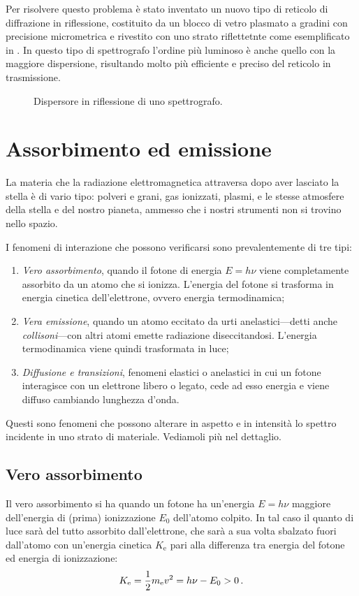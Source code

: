     Per risolvere questo problema è stato inventato un nuovo tipo di reticolo di diffrazione in riflessione, costituito da un blocco di vetro plasmato a gradini con precisione micrometrica e rivestito con uno strato riflettetnte come esemplificato in . In questo tipo di spettrografo l'ordine più luminoso è anche quello con la maggiore dispersione, risultando molto più efficiente e preciso del reticolo in trasmissione.
    \begin{figure}
        \centering
        \caption{Dispersore in riflessione di uno spettrografo.}
        \label{fig:grating-spectrographer}
    \end{figure}

\section{Assorbimento ed emissione}
    La materia che la radiazione elettromagnetica attraversa dopo aver lasciato la stella è di vario tipo: polveri e grani, gas ionizzati, plasmi, e le stesse atmosfere della stella e del nostro pianeta, ammesso che i nostri strumenti non si trovino nello spazio.

    I fenomeni di interazione che possono verificarsi sono prevalentemente di tre tipi:
    \begin{enumerate}[label=\ding{70}]
        \item \emph{Vero assorbimento}, quando il fotone di energia $E = h\nu$ viene completamente assorbito da un atomo che si ionizza. L'energia del fotone si trasforma in energia cinetica dell'elettrone, ovvero energia termodinamica;
        \item \emph{Vera emissione}, quando un atomo eccitato da urti anelastici---detti anche \emph{collisoni}---con altri atomi emette radiazione diseccitandosi. L'energia termodinamica viene quindi trasformata in luce;
        \item \emph{Diffusione e transizioni}, fenomeni elastici o anelastici in cui un fotone interagisce con un elettrone libero o legato, cede ad esso energia e viene diffuso cambiando lunghezza d'onda.
    \end{enumerate}
    Questi sono fenomeni che possono alterare in aspetto e in intensità lo spettro incidente in uno strato di materiale. Vediamoli più nel dettaglio.
    \subsection{Vero assorbimento}
        Il vero assorbimento si ha quando un fotone ha un'energia $E = h\nu$ maggiore dell'energia di (prima) ionizzazione $E_0$ dell'atomo colpito. In tal caso il quanto di luce sarà del tutto assorbito dall'elettrone, che sarà a sua volta sbalzato fuori dall'atomo con un'energia cinetica $K_\text{e}$ pari alla differenza tra energia del fotone ed energia di ionizzazione:
        \begin{equation*}
            K_\text{e} = \frac{1}{2} m_\text{e} v^2 = h\nu - E_0 > 0
            \,.
        \end{equation*}
        
